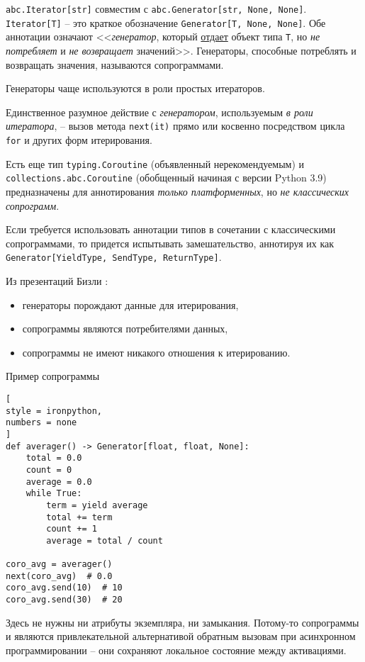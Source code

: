 \documentclass[%
	11pt,
	a4paper,
	utf8,
		]{article}
\begin{document}
\verb*|abc.Iterator[str]| совместим с \verb|abc.Generator[str, None, None]|. {\color{blue}\verb*|Iterator[T]| -- это краткое обозначение \verb|Generator[T, None, None]|}. Обе аннотации означают <<\emph{генератор}, который \underline{отдает} объект типа \verb|T|, но \emph{не потребляет} и \emph{не возвращает} значений>>. Генераторы, способные потреблять и возвращать значения, называются сопрограммами.

Генераторы чаще используются в роли простых итераторов.

Единственное разумное действие с \emph{генератором}, используемым \emph{в роли итератора}, -- вызов метода \verb*|next(it)| прямо или косвенно посредством цикла \verb*|for| и других форм итерирования.

Есть еще тип \verb*|typing.Coroutine| (объявленный нерекомендуемым) и \verb|collections.abc.Coroutine| (обобщенный начиная с версии Python 3.9) предназначены для аннотирования \emph{только платформенных}, но \emph{не классических сопрограмм}.

Если требуется использовать аннотации типов в сочетании с классическими сопрограммами, то придется испытывать замешательство, аннотируя их как \verb|Generator[YieldType, SendType, ReturnType]|.

Из презентаций Бизли \cite[]{ramalho:python-2022}:
\begin{itemize}
	\item генераторы порождают данные для итерирования,
	
	\item сопрограммы являются потребителями данных,
	
	\item сопрограммы не имеют никакого отношения к итерированию.
\end{itemize}

Пример сопрограммы
\begin{lstlisting}[
style = ironpython,
numbers = none
]
def averager() -> Generator[float, float, None]:
    total = 0.0
    count = 0
    average = 0.0
    while True:
        term = yield average
        total += term
        count += 1
        average = total / count
        
coro_avg = averager()
next(coro_avg)  # 0.0
coro_avg.send(10)  # 10
coro_avg.send(30)  # 20
\end{lstlisting}

Здесь не нужны ни атрибуты экземпляра, ни замыкания. Потому-то сопрограммы и являются привлекательной альтернативой обратным вызовам при асинхронном программировании -- они сохраняют локальное состояние между активациями.
\end{document}
